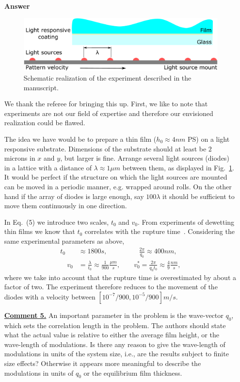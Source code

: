 \documentclass[12pt,english]{article}
\begin{document}
\begin{itemize}
\item[ \textbf{{Answer}}]
{
\begin{figure}
    \centering
    \includegraphics[width=\textwidth]{simple_exp.pdf}
    \caption{Schematic realization of the experiment described in the manuscript.}
    \label{fig:experiment_illustration}
\end{figure}
We thank the referee for bringing this up.
First, we like to note that experiments are not our field of expertise and therefore our envisioned realization could be flawed.

The idea we have would be to prepare a thin film ($h_0 \approx 4nm$ PS) on a light responsive substrate.
Dimensions of the substrate should at least be $2$ microns in $x$ and $y$, but larger is fine.
Arrange several light sources (diodes) in a lattice with a distance of $\lambda \approx 1\mu m$ between them, as displayed in Fig.~\ref{fig:experiment_illustration}.
It would be perfect if the structure on which the light sources are mounted can be moved in a periodic manner, e.g. wrapped around rolls.
On the other hand if the array of diodes is large enough, say $100\lambda$ it should be sufficient to move them continuously in one direction. 

In Eq.~(5) we introduce two scales, $t_0$ and $v_0$.
From experiments of dewetting thin films we know that $t_0$ correlates with the rupture time~\cite{becker2003complex, fetzer2007thermal}.
Considering the same experimental parameters as above, 
\begin{align*}
    t_0 &\approx 1800s,\qquad~~~\qquad \frac{2\pi}{q_0}\approx 400nm, \\
    \quad v_0 &= \frac{\lambda}{t_0} \approx \frac{1}{900}\frac{\mu m}{s},\quad \quad v_0^{\ast} = \frac{2\pi}{q_0 t_0} \approx \frac{4}{9}\frac{nm}{s},
\end{align*}
where we take into account that the rupture time is overestimated by about a factor of two.
The experiment therefore reduces to the movement of the diodes with a velocity between $[10^{-7}/900, 10^{-5}/900] m/s$. 
}

\item[ \textbf{\underline{Comment 5.}}]
{
An important parameter in the problem is the wave-vector $q_0$, which sets the correlation length in the problem. 
The authors should state what the actual value is relative to either the average film height, or the wave-length of modulations. 
Is there any reason to give the wave-length of modulations in units of the system size, i.e., are the results subject to finite size effects? Otherwise it appears more meaningful to describe the modulations in units of $q_0$ or the equilibrium film thickness.
}


\end{itemize}
\end{document}
